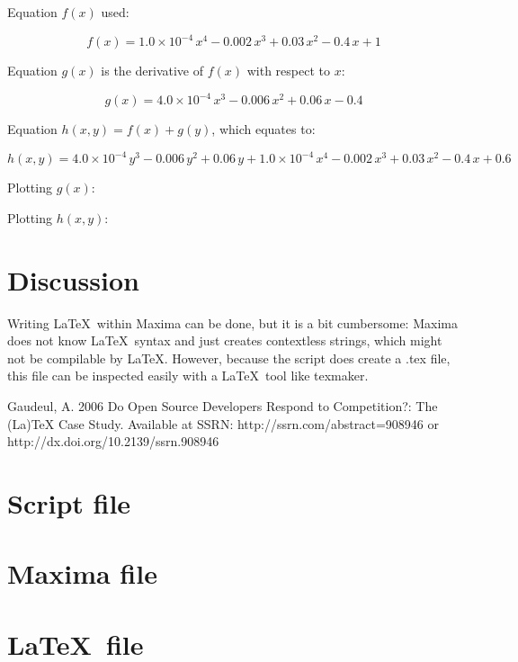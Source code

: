 \documentclass{article}
\begin{document}
Equation $f(x)$ used:

$$f\left(x\right)=1.0 \times 10^{-4}\,x^4-0.002\,x^3+0.03\,x^2-0.4\,x
 +1$$

Equation $g(x)$ is the derivative of $f(x)$ with respect to $x$:

$$g\left(x\right)=4.0 \times 10^{-4}\,x^3-0.006\,x^2+0.06\,x-0.4$$

Equation $h(x,y) = f(x) + g(y)$, which equates to:

$$h\left(x , y\right)=4.0 \times 10^{-4}\,y^3-0.006\,y^2+0.06\,y+
 1.0 \times 10^{-4}\,x^4-0.002\,x^3+0.03\,x^2-0.4\,x+0.6$$

Plotting $g(x)$:

Plotting $h(x,y)$:


\section{Discussion}

Writing \LaTeX~within Maxima can be done, but it is a bit cumbersome:
Maxima does not know \LaTeX~syntax and just creates contextless strings,
which might not be compilable by \LaTeX.
However, because the script does create a .tex file,
this file can be inspected easily with a \LaTeX~tool like texmaker.

\begin{thebibliography}{9}

  Gaudeul, A.
  2006
  Do Open Source Developers Respond to Competition?: The (La)TeX Case Study.
  Available at SSRN: http://ssrn.com/abstract=908946 or http://dx.doi.org/10.2139/ssrn.908946
\end{thebibliography}

\appendix

\section{Script file}



\section{Maxima file}



\section{\LaTeX~file}


\end{document}
